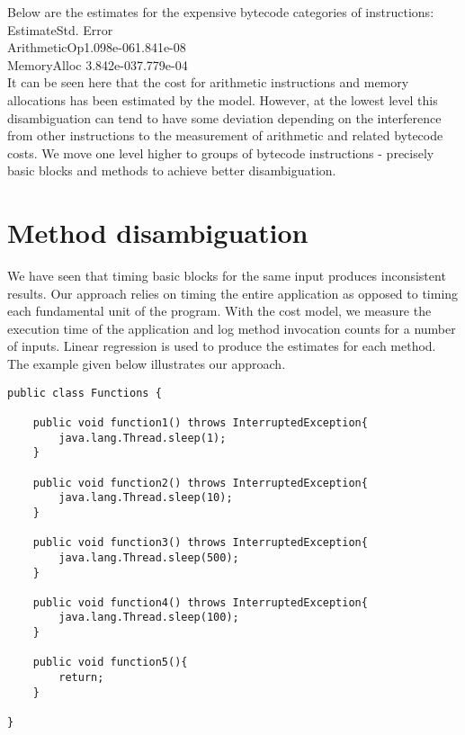 Below are the estimates for the expensive bytecode categories of instructions:\\

\hspace{8em}Estimate\hspace{2em}Std. Error \\
ArithmeticOp\hspace{2em}1.098e-06\hspace{2em}1.841e-08  \\
MemoryAlloc \hspace{2em}3.842e-03\hspace{2em}7.779e-04 \\

It can be seen here that the cost for arithmetic instructions and memory allocations has been estimated by the model. However, at the lowest level this disambiguation can tend to have some deviation depending on the interference from other instructions to the measurement of arithmetic and related bytecode costs. We move one level higher to groups of bytecode instructions - precisely basic blocks and methods to achieve better disambiguation.\newline

\section{Method disambiguation}
We have seen that timing basic blocks for the same input produces inconsistent results. Our approach relies on timing the entire application as opposed to timing each fundamental unit of the program. With the cost model, we measure the execution time of the application and log method invocation counts for a number of inputs. Linear regression is used to produce the estimates for each method. The example given below illustrates our approach.

\singlespacing
\begin{lstlisting}
public class Functions {
	
	public void function1() throws InterruptedException{
		java.lang.Thread.sleep(1);
	}
	
	public void function2() throws InterruptedException{
		java.lang.Thread.sleep(10);
	}
	
	public void function3() throws InterruptedException{
		java.lang.Thread.sleep(500);
	}
	
	public void function4() throws InterruptedException{
		java.lang.Thread.sleep(100);
	}
	
	public void function5(){
		return;
	}
	
}
\end{lstlisting}
\doublespacing

